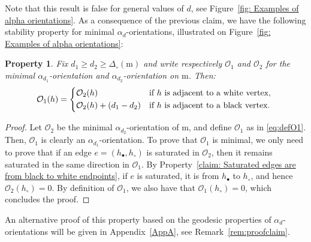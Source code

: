 \documentclass[11pt,reqno,tbtags]{amsart}
\renewcommand{\rm}{\mathrm{m}}
\newtheorem{property}[theo]{Property}
\numberwithin{equation}{section}
\numberwithin{theo}{section}
\theoremstyle{definition}
\newcommand{\nicolas}[1]{\textcolor{purple}{Nicolas :  #1}}
\newcommand{\cO}{\mathcal{O}}
\begin{document}
Note that this result is false for general values of $d$, see Figure~\ref{fig: Examples of alpha orientations}. As a consequence of the previous claim, we have the following stability property for minimal $\alpha_d$-orientations, illustrated on Figure~\ref{fig: Examples of alpha orientations}:
\begin{property}\label{claim:stability for orientations}
Fix $d_1\geq d_2\geq\Delta_\circ(\mathrm{m})$ and write respectively $\cO_1$ and $\cO_2$ for the minimal $\alpha_{d_1}$-orientation and $\alpha_{d_2}$-orientation on $\rm$. Then:  
\begin{equation}\label{eq:defO1}
    \cO_1(h) =
    \begin{cases*}
      \cO_2(h)   & if $h$ is adjacent to a white vertex, \\
      \cO_2(h) + (d_1-d_2)  & if $h$ is adjacent to a black vertex.
    \end{cases*}
\end{equation}
\end{property}
\begin{proof}
Let $\cO_2$ be the minimal $\alpha_{d_2}$-orientation of $\rm$, and define $\cO_1$ as in \eqref{eq:defO1}. Then, $\cO_1$ is clearly an $\alpha_{d_1}$-orientation. To prove that $\cO_1$ is minimal, we only need to prove that if an edge $e=(h_\bullet,h_\circ)$ is saturated in $\cO_2$, then it remains saturated in the same direction in $\cO_1$. By Property~\ref{claim: Saturated edges are from black to white endpoints}, if $e$ is saturated, it is from $h_\bullet$ to $h_\circ$, and hence $\cO_2(h_\circ)=0$. By definition of $\cO_1$, we also have that $\cO_1(h_\circ)=0$, which concludes the proof. 
\end{proof}
An alternative proof of this property based on the geodesic properties of $\alpha_d$-orientations will be given in Appendix~\ref{AppA}, see Remark~\ref{rem:proofclaim}.

\end{document}
